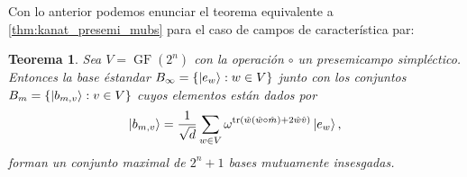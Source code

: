 \documentclass[a4paper,11pt]{report}
\DeclareMathOperator{\tr}{tr}
\DeclareMathOperator{\GF}{GF}
\newtheorem{theorem}{Teorema}
\begin{document}
  Con lo anterior podemos enunciar el teorema equivalente a
  \ref{thm:kanat_presemi_mubs} para el caso de campos de
  característica par:
  \begin{theorem}
    \label{thm:kanat_even}
    Sea $V = \GF(2^{n})$ con la operación $\circ$ un
    presemicampo simpléctico. Entonces la base éstandar
    $B_\infty = \{\ket{e_w} : w \in V\}$ junto con los
    conjuntos $B_m = \{\ket{b_{m,v}} : v \in V\}$ cuyos
    elementos están dados por
    \begin{equation}
      \ket{b_{m,v}}
      = \frac{1}{\sqrt{d}} \sum_{w \in V}^{}
      \omega^{\tr\left(
        \hat w ( \hat w \circ \hat m ) + 2 \hat w \hat v
      \right) } \ket{e_w},
    \end{equation}
    forman un conjunto maximal de $2^{n} + 1$ bases
    mutuamente insesgadas.
  \end{theorem}
\end{document}
